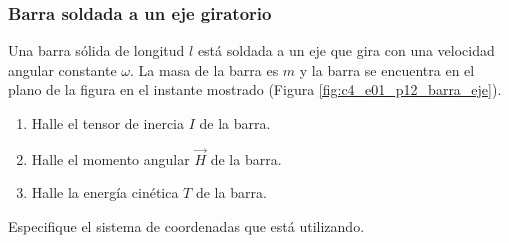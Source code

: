 \subsubsection{Barra soldada a un eje giratorio}

Una barra sólida de longitud $l$ está soldada a un eje que gira con una velocidad angular
constante $\omega$. La masa de la barra es $m$ y la barra se encuentra en el plano de la figura
en el instante mostrado (Figura \ref{fig:c4_e01_p12_barra_eje}).

\begin{enumerate}
    \item Halle el tensor de inercia $I$ de la barra.
    \item Halle el momento angular $\vec{H}$ de la barra.
    \item Halle la energía cinética $T$ de la barra.
\end{enumerate}

\noindent Especifique el sistema de coordenadas que está utilizando.

